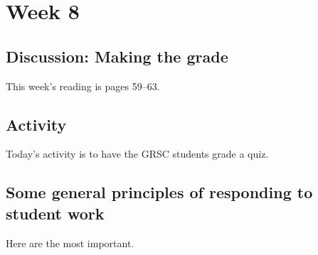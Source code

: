 
\section{Week 8}
\label{sec:week-8}

\subsection{Discussion: Making the grade}
\label{sec:making-grade}

This week's reading is pages 59--63.  

\subsection{Activity}
\label{sec:activity}

Today's activity is to have the GRSC students grade a quiz.  

\subsection{Some general principles of responding to student work}
\label{sec:some-gener-princ}

Here are the most important.

